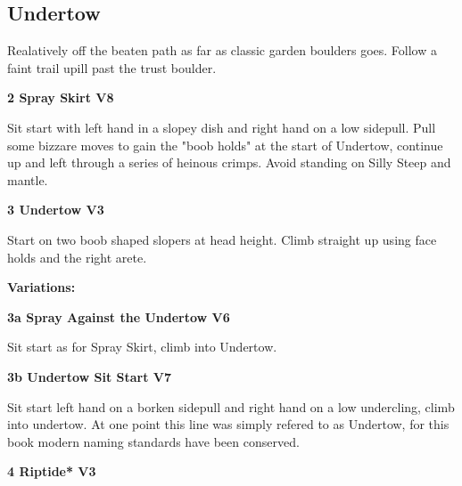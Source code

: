 \begin{multicols}{2}
		\subsection*{Undertow}\label{bf:Undertow}
		Realatively off the beaten path as far as classic garden boulders goes. Follow a faint trail upill past the trust boulder.\\
	

			\label{rt:Spray Skirt}
\colorbox{Goldenrod!50}{
\parbox{0.95\linewidth}{
\textbf{
2 Spray Skirt V8  
}
}
}

			\begin{adjustwidth}{0.5cm}{}				
			Sit start with left hand in a slopey dish and right hand on a low sidepull. Pull some bizzare moves to gain the "boob holds" at the start of Undertow, continue up and left through a series of heinous crimps. Avoid standing on Silly Steep and mantle.
			\end{adjustwidth}
			\label{rt:Undertow}
\colorbox{green!20}{
\parbox{0.95\linewidth}{
\textbf{
3 Undertow V3  
}
}
}

			\begin{adjustwidth}{0.5cm}{}				
			Start on two boob shaped slopers at head height. Climb straight up using face holds and the right arete.
			\end{adjustwidth}
				\begin{adjustwidth}{0.5cm}{}				
				\textbf{Variations:} \newline
					\label{vr:Spray Against the Undertow}
\colorbox{RoyalBlue!20}{
\parbox{0.95\linewidth}{
\textbf{
3a Spray Against the Undertow V6  
}
}
}

					\begin{adjustwidth}{0.5cm}{}				
					Sit start as for Spray Skirt, climb into Undertow.
					\end{adjustwidth}
					\label{vr:Undertow Sit Start}
\colorbox{Goldenrod!50}{
\parbox{0.95\linewidth}{
\textbf{
3b Undertow Sit Start V7  
}
}
}

					\begin{adjustwidth}{0.5cm}{}				
					Sit start left hand on a borken sidepull and right hand on a low undercling, climb into undertow. At one point this line was simply refered to as Undertow, for this book modern naming standards have been conserved.
					\end{adjustwidth}
				\end{adjustwidth}
			\label{rt:Riptide}
\colorbox{green!20}{
\parbox{0.95\linewidth}{
\textbf{
4 Riptide* V3  
}
}
}


\end{multicols}
